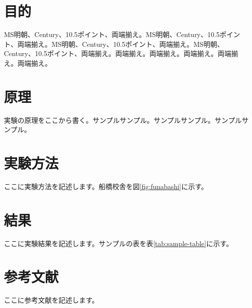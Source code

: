 \documentclass[a4paper,12pt]{ltjsarticle}
\begin{document}
\section{目的}

MS明朝、Century、10.5ポイント、両端揃え。MS明朝、Century、10.5ポイント、両端揃え。MS明朝、Century、10.5ポイント、両端揃え。MS明朝、Century、10.5ポイント、両端揃え。両端揃え。両端揃え。両端揃え。両端揃え。両端揃え。

\section{原理}
実験の原理をここから書く。サンプルサンプル。サンプルサンプル。サンプルサンプル。

\section{実験方法}
ここに実験方法を記述します。船橋校舎を図\ref{fig:funabashi}に示す。

\section{結果}
ここに実験結果を記述します。サンプルの表を表\ref{tab:sample-table}に示す。


\section{参考文献}
ここに参考文献を記述します。
\end{document}
